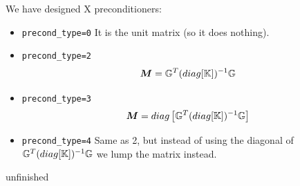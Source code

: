 We have designed X preconditioners:
\begin{itemize}
\item {\tt precond\_type=0} It is the unit matrix (so it does nothing). 

\item {\tt precond\_type=2}
\[
{\bm M} = {\mathbb{G}}^T (diag [{\mathbb{K}}]  )^{-1} {\mathbb{G}} 
\]
\item {\tt precond\_type=3} 
\[
{\bm M} = diag \left[ {\mathbb{G}}^T (diag [{\mathbb{K}}]  )^{-1} {\mathbb{G}} \right]
\]
\item {\tt precond\_type=4} Same as 2, but instead of using the 
diagonal of $ {\mathbb{G}}^T (diag [{\mathbb{K}}]  )^{-1} {\mathbb{G}}$ we lump the matrix instead.

\end{itemize}

{\color{red} \Large unfinished}
